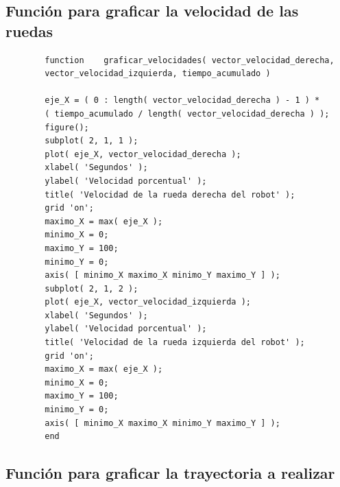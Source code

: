 \documentclass[12pt,a4paper]{article}
\begin{document}
        \subsection{Función para graficar la velocidad de las ruedas}
        
        \begin{verbatim}
        function    graficar_velocidades( vector_velocidad_derecha,
        vector_velocidad_izquierda, tiempo_acumulado )
        
        eje_X = ( 0 : length( vector_velocidad_derecha ) - 1 ) *
        ( tiempo_acumulado / length( vector_velocidad_derecha ) );
        figure();
        subplot( 2, 1, 1 );
        plot( eje_X, vector_velocidad_derecha );
        xlabel( 'Segundos' );
        ylabel( 'Velocidad porcentual' );
        title( 'Velocidad de la rueda derecha del robot' );
        grid 'on';
        maximo_X = max( eje_X );
        minimo_X = 0;
        maximo_Y = 100;
        minimo_Y = 0;
        axis( [ minimo_X maximo_X minimo_Y maximo_Y ] );
        subplot( 2, 1, 2 );
        plot( eje_X, vector_velocidad_izquierda );
        xlabel( 'Segundos' );
        ylabel( 'Velocidad porcentual' );
        title( 'Velocidad de la rueda izquierda del robot' );
        grid 'on';
        maximo_X = max( eje_X );
        minimo_X = 0;
        maximo_Y = 100;
        minimo_Y = 0;
        axis( [ minimo_X maximo_X minimo_Y maximo_Y ] );
        end
		\end{verbatim}
        
        
        \subsection{Función para graficar la trayectoria a realizar}
        
\end{document}
